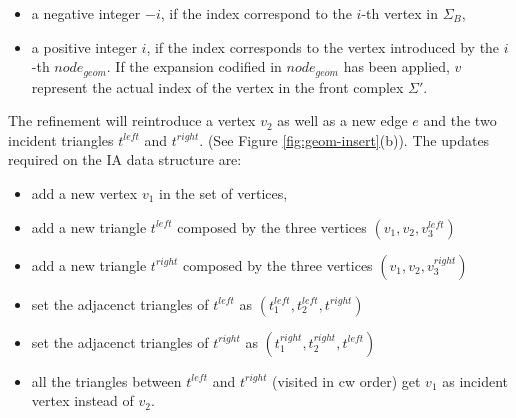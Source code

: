 \documentclass[preprint,5p,times,onecolumn]{article}
\begin{document}
\begin{itemize}
	\item a negative integer $-i$, if the index correspond to the $i$-th vertex in $\Sigma_B$,
	\item a positive integer $i$, if the index corresponds to the vertex introduced by the $i$-th $node_{geom}$. If the expansion codified in $node_{geom}$ has been applied, $v$ represent the actual index of the vertex in the front complex $\Sigma'$.
\end{itemize}

The refinement will reintroduce a vertex $v_2$ as well as a new edge $e$ and the two incident triangles $t^{left}$ and $t^{right}$. (See Figure \ref{fig:geom-insert}(b)).
The updates required on the IA data structure are:
\begin{itemize}
	\item add a new vertex $v_1$ in the set of vertices,
	\item add a new triangle $t^{left}$ composed by the three vertices $(v_1,v_2,v_3^{left})$
	\item add a new triangle $t^{right}$ composed by the three vertices $(v_1,v_2,v_3^{right})$
	\item set the adjacenct triangles of $t^{left}$ as $(t_1^{left}, t_2^{left}, t^{right})$
    	\item set the adjacenct triangles of $t^{right}$ as $(t_1^{right}, t_2^{right}, t^{left})$
	\item all the triangles between $t^{left}$ and $t^{right}$ (visited in cw order) get $v_1$ as incident vertex instead of $v_2$.
\end{itemize}
\end{document}
